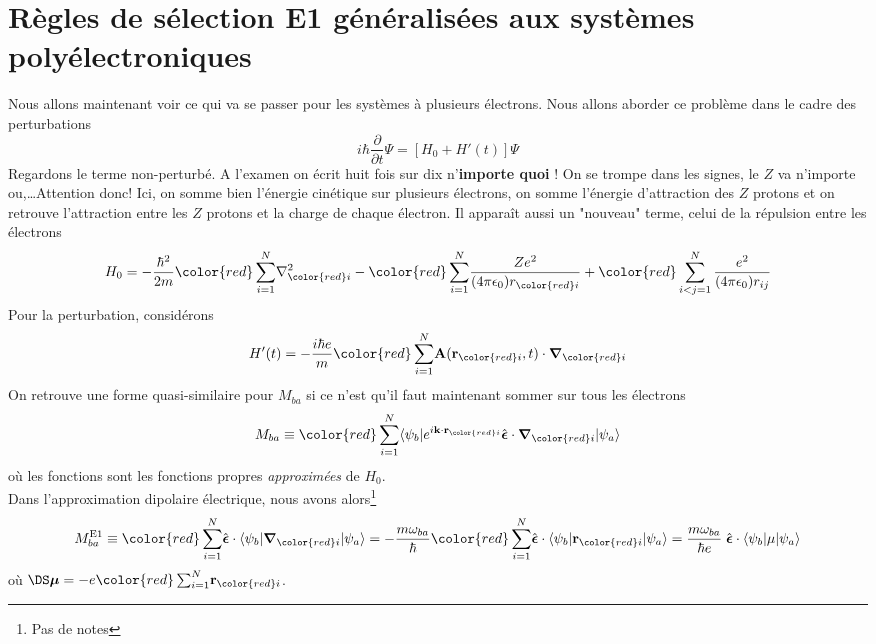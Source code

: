 \section{Règles de sélection E1 généralisées aux systèmes polyélectroniques}
Nous allons maintenant voir ce qui va se passer pour les systèmes à plusieurs électrons. Nous 
allons aborder ce problème dans le cadre des perturbations
\begin{equation}
i \hbar \frac{\partial}{\partial t} \Psi  = [ H_0 + H'(t)] \Psi
\end{equation}
Regardons le terme non-perturbé. A l'examen on écrit huit fois sur dix n'\textbf{importe quoi} !
On se trompe dans les signes, le $Z$ va n'importe ou,\dots Attention donc! Ici, on somme bien
l'énergie cinétique sur plusieurs électrons, on somme l'énergie d'attraction des $Z$ protons et
on retrouve l'attraction entre les $Z$ protons et la charge de chaque électron. Il apparaît aussi
un "nouveau" terme, celui de la répulsion entre les électrons
\begin{equation}
H_0 = -\frac{\hbar ^2}{2m} 
 {\color{red} \sum_{i=1}^N } 
\nabla ^2 _{{\color{red} i }} 
-  {\color{red} \sum_{i=1}^N }  
\frac{Ze^2}{(4 \pi \epsilon_0) r_{{\color{red} i }}  } 
+  {\color{red}
\sum_{i < j=1}^N 
\frac{e^2}{(4 \pi \epsilon_0) r_{ij}}
}
\end{equation} 
Pour la perturbation, considérons
\begin{equation}
H'(t) = - \frac{i \hbar e}{m}
{\color{red} \sum_{i=1}^N }
{\bf A}( {\bf r}_{{\color{red} i}} , t) 
\cdot \mbox{\boldmath $ \nabla $}_{{\color{red} i}}
\end{equation}
On retrouve une forme quasi-similaire pour $M_{ba}$ si ce n'est qu'il faut maintenant sommer sur 
tous les électrons
\begin{equation}
M_{ba} \equiv 
{\color{red} \sum_{i= 1}^N }
 \langle \psi_b \vert 
e^{i {\bf k} \cdot {\bf r}_{{\color{red} i}} }
  \hat{  \mbox{\boldmath $ \epsilon $}} \cdot 
\mbox{\boldmath $ \nabla $} _{{\color{red} i}} \vert \psi_a \rangle
\end{equation}
où les fonctions sont les fonctions propres \textit{approximées} de $H_0$.\\

Dans l'approximation dipolaire électrique, nous avons alors\footnote{Pas de notes}
\begin{equation}
M_{ba}^{\rm{E1}} \equiv 
{\color{red} \sum_{i= 1}^N }
 \hat{  \mbox{\boldmath $ \epsilon $}} \cdot 
 \langle \psi_b \vert 
\mbox{\boldmath $ \nabla $} _{{\color{red} i}} 
\vert \psi_a \rangle
=
- \frac{m \omega_{ba}}{\hbar} 
{\color{red} \sum_{i= 1}^N }
\hat{  \mbox{\boldmath $ \epsilon $}} \cdot 
\langle \psi_b \vert {\bf r} _{{\color{red} i}}  \vert \psi_a \rangle = \frac{m \omega_{ba}}{\hbar e}
 \; \hat{  \mbox{\boldmath $ \epsilon $}} \cdot 
\langle \psi_b \vert \mu
\vert \psi_a \rangle
\end{equation}
où $\DS \mbox{\boldmath $ \mu $} = 
-e {\color{red} \sum_{i=1}^N } {\bf r}_{{\color{red} i}}$.\\

